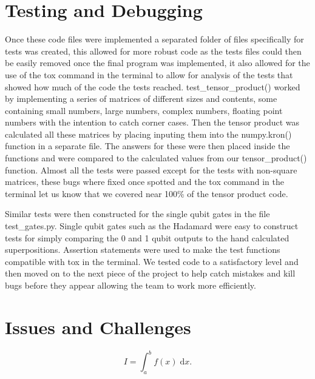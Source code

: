 \documentclass{article}
\begin{document}




\section{Testing and Debugging}

Once these code files were implemented a separated folder of files specifically for tests was created, this allowed for more robust code as the tests files could then be easily removed once the final program was implemented, it also allowed for the use of the tox command in the terminal to allow for analysis of the tests that showed how much of the code the tests reached. test\_tensor\_product() worked by implementing a series of matrices of different sizes and contents, some containing small numbers, large numbers, complex numbers, floating point numbers with the intention to catch corner cases. Then the tensor product was calculated all these matrices by placing inputing them into the numpy.kron() function in a separate file. The answers for these were then placed inside the functions and were compared to the calculated values from our tensor\_product() function. Almost all the tests were passed except for the tests with non-square matrices, these bugs where fixed once spotted and the tox command in the terminal let us know that we covered near 100\% of the tensor product code.

Similar tests were then constructed for the single qubit gates in the file test\_gates.py. Single qubit gates such as the Hadamard were easy to construct tests for simply comparing the 0 and 1 qubit outputs to the hand calculated superpositions. Assertion statements were used to make the test functions compatible with tox in the terminal. We tested code to a satisfactory level and then moved on to the next piece of the project to help catch mistakes and kill bugs before they appear allowing the team to work more efficiently.

\section{Issues and Challenges}






\begin{equation}
	I = \int_{a}^{b} f(x) \; \text{d}x.
\end{equation}
\end{document}
